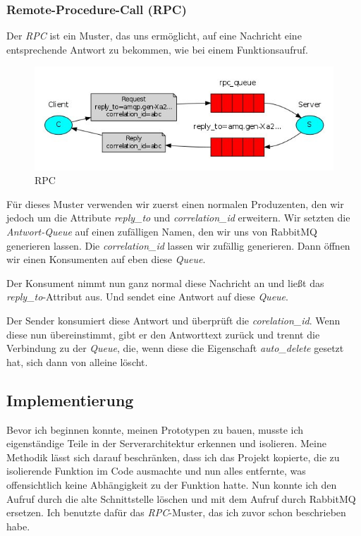 \documentclass[12pt,a4paper]{scrartcl}
\begin{document}
\subsubsection{Remote-Procedure-Call (RPC)}
Der \emph{RPC} ist ein Muster, das uns ermöglicht, auf eine Nachricht eine entsprechende Antwort zu bekommen, wie bei einem Funktionsaufruf. 

\begin{figure}[h!]
	\centering
	\includegraphics[scale=0.74]{RPC.jpg}
	\caption[https://www.rabbitmq.com/tutorials/tutorial-six-dotnet.html]{RPC}
\end{figure}

Für dieses Muster verwenden wir zuerst einen normalen Produzenten, den wir jedoch um die Attribute \emph{reply\_to} und \emph{correlation\_id} erweitern. Wir setzten die \emph{Antwort-Queue} auf einen zufälligen Namen, den wir uns von RabbitMQ generieren lassen. 
Die \emph{correlation\_id} lassen wir zufällig generieren. Dann öffnen wir einen Konsumenten auf eben diese \emph{Queue}.

Der Konsument nimmt nun ganz normal diese Nachricht an und ließt das \emph{reply\_to}-Attribut aus. Und sendet eine Antwort auf diese \emph{Queue}.

Der Sender konsumiert diese Antwort und überprüft die \emph{corelation\_id}. Wenn diese nun übereinstimmt, gibt er den Antworttext zurück und trennt die Verbindung zu der \emph{Queue}, die, wenn diese die Eigenschaft  \emph{auto\_delete} gesetzt hat, sich dann von alleine löscht.

\subsection{Implementierung}

Bevor ich beginnen konnte, meinen Prototypen zu bauen, musste ich eigenständige Teile in der Serverarchitektur erkennen und isolieren. 
Meine Methodik lässt sich darauf beschränken, dass ich das Projekt kopierte, die zu isolierende Funktion im Code ausmachte und nun alles entfernte, was offensichtlich keine Abhängigkeit zu der Funktion hatte. 
Nun konnte ich den Aufruf durch die alte Schnittstelle löschen und mit dem Aufruf durch RabbitMQ ersetzen. Ich benutzte dafür das  \emph{RPC}-Muster, das ich zuvor schon beschrieben habe. 
\end{document}
